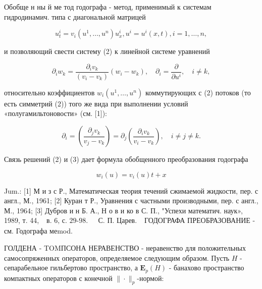 \documentclass[10pt]{article}
\begin{document}
Обобще н ны й ме тод годографа - метод, применимый к системам гидродинамич. типа с диагональной матрицей



\[

u_{t}^{i}=v_{i}\left(u^{1}, \ldots, u^{n}\right) u_{x}^{i}, u^{i}=u^{i}(x, t), i=1, \ldots, n,

\]



и позволяющий свести систему (2) к линейной системе уравнений



\[

\partial_{i} w_{k}=\frac{\partial_{i} v_{k}}{\left(v_{i}-v_{k}\right)}\left(w_{i}-w_{k}\right), \quad \partial_{i}=\frac{\partial}{\partial u^{i}}, \quad i \neq k,

\]



относительно коэффициентов $w_{i}\left(u^{1}, \ldots, u^{n}\right)$ коммутирующих с (2) потоков (то есть симметрий (2)) того же вида при выполнении условий «полугамильтоновости» (см. [1]):



\[

\partial_{i}=\left(\frac{\partial_{j} v_{k}}{v_{j}-v_{k}}\right)=\partial_{j}\left(\frac{\partial_{i} v_{k}}{v_{i}-v_{k}}\right), \quad i \neq j \neq k .

\]



Связь решений (2) и (3) дает формула обобщенного преобразования годографа



\[

w_{i}(u)=v_{i}(u) t+x

\]



Jum.: [1] М и з с Р., Математическая теория течений сжимаемой жидкости, пер. с англ., М., 1961; [2] Куран т Р., Уравнения с частными производными, пер. с англ., М., 1964; [3] Дубров и н Б. А., Н о в и ко в С. П., "Успехи математич. наук», 1989, т. 44, $\begin{array}{ll}\text { в. 6, с. 29-98. } & \text { С. П. Царев. }\end{array}$ ГОДОГРАФА ПРЕОБРАЗОВАНИЕ - см. Годографа меmod.



ГОЛДЕНА - TOMПСОНА НЕРАВЕНСТВО - неравенство для положительных самосопряженных операторов, определяемое следующим образом. Пусть $H$ - сепарабельное гильбертово пространство, а $\boldsymbol{E}_{p}(H)$ - банахово пространство компактных операторов с конечной $\|\cdot\|_{p}$-нормой:
\end{document}
